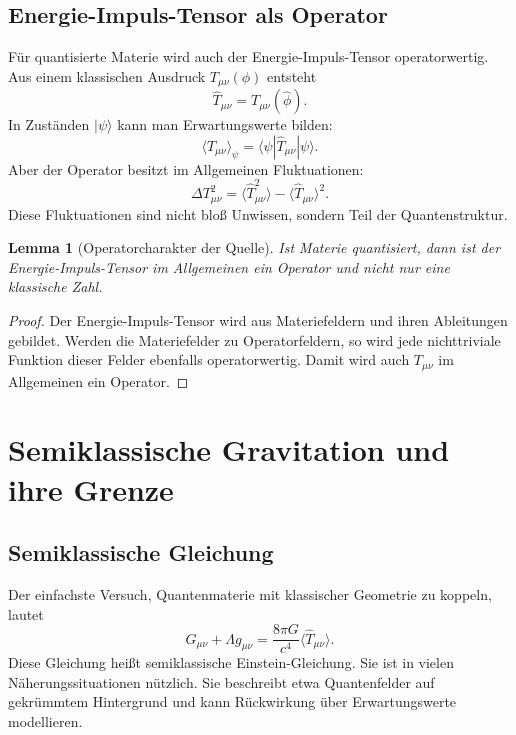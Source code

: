 \documentclass[11pt,a4paper]{book}
\newtheorem{lemma}{Lemma}[chapter]
\theoremstyle{remark}
\newcommand{\bra}[1]{\langle #1|}
\newcommand{\ket}[1]{|#1\rangle}
\begin{document}
\section{Energie-Impuls-Tensor als Operator}
Für quantisierte Materie wird auch der Energie-Impuls-Tensor operatorwertig. Aus einem klassischen Ausdruck $T_{\mu\nu}(\phi)$ entsteht
\begin{equation}
\hat T_{\mu\nu}=T_{\mu\nu}(\hat\phi).
\end{equation}
In Zuständen $\ket{\psi}$ kann man Erwartungswerte bilden:
\begin{equation}
\langle T_{\mu\nu}\rangle_\psi=\bra{\psi}\hat T_{\mu\nu}\ket{\psi}.
\end{equation}
Aber der Operator besitzt im Allgemeinen Fluktuationen:
\begin{equation}
\Delta T_{\mu\nu}^2=\langle \hat T_{\mu\nu}^2\rangle-\langle \hat T_{\mu\nu}\rangle^2.
\end{equation}
Diese Fluktuationen sind nicht bloß Unwissen, sondern Teil der Quantenstruktur.

\begin{lemma}[Operatorcharakter der Quelle]
Ist Materie quantisiert, dann ist der Energie-Impuls-Tensor im Allgemeinen ein Operator und nicht nur eine klassische Zahl.
\end{lemma}

\begin{proof}
Der Energie-Impuls-Tensor wird aus Materiefeldern und ihren Ableitungen gebildet. Werden die Materiefelder zu Operatorfeldern, so wird jede nichttriviale Funktion dieser Felder ebenfalls operatorwertig. Damit wird auch $T_{\mu\nu}$ im Allgemeinen ein Operator.
\end{proof}

\chapter{Semiklassische Gravitation und ihre Grenze}
\section{Semiklassische Gleichung}
Der einfachste Versuch, Quantenmaterie mit klassischer Geometrie zu koppeln, lautet
\begin{equation}
G_{\mu\nu}+\Lambda g_{\mu\nu}=\frac{8\pi G}{c^4}\langle \hat T_{\mu\nu}\rangle.
\end{equation}
Diese Gleichung heißt semiklassische Einstein-Gleichung. Sie ist in vielen Näherungssituationen nützlich. Sie beschreibt etwa Quantenfelder auf gekrümmtem Hintergrund und kann Rückwirkung über Erwartungswerte modellieren.
\end{document}
